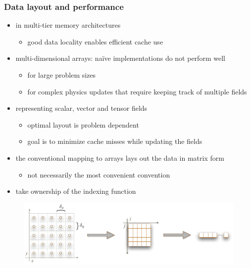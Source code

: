 \begin{frame}[fragile]
%
  \frametitle{Data layout and performance}
%
  \begin{itemize}
%
  \item in multi-tier memory architectures
    \begin{itemize}
    \item good data locality enables efficient cache use
    \end{itemize}
%
  \item multi-dimensional arrays: na\"ive implementations do not perform well
    \begin{itemize}
    \item for large problem sizes
    \item for complex physics updates that require keeping track of multiple fields
    \end{itemize}
%
  \item representing scalar, vector and tensor fields
    \begin{itemize}
    \item optimal layout is problem dependent
    \item goal is to minimize cache misses while updating the fields
    \end{itemize}
%
  \item the conventional mapping to arrays lays out the data in matrix form
    \begin{itemize}
    \item not necessarily the most convenient convention
    \end{itemize}
%
  \item take ownership of the indexing function
% 
  \end{itemize}
%
  \begin{figure}
    \includegraphics[scale=0.7]{figures/structured-coordinates.pdf}
  \end{figure} 
%
\end{frame}

